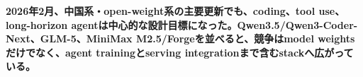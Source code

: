\noindent\textbf{2026年2月、中国系・open-weight系の主要更新でも、coding、tool use、long-horizon agentは中心的な設計目標になった。Qwen3.5/Qwen3-Coder-Next、GLM-5、MiniMax M2.5/Forgeを並べると、競争はmodel weightsだけでなく、agent trainingとserving integrationまで含むstackへ広がっている。}\autocite{src-9156c37fb1c2,src-d8e13386974c,src-eac8dfbeb78c}

